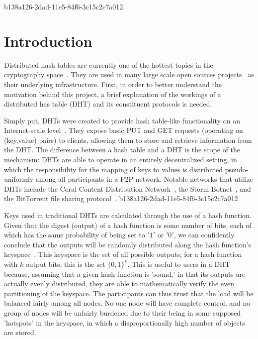 \documentclass[12pt]{article}
\begin{document}
b138a126-2dad-11e5-84f6-3c15c2c7a012\section{Introduction}
\par Distributed hash tables are currently one of the hottest topics in the cryptography space~\cite{Stoica:2001dj,Rowstron:2001ea,Ratnasamy:2001wn}. They are used in many large scale open sources projects~\cite{Freitas:2013tb,Xu:2010vs,Perfitt:2010fh} as their underlying infrastructure. First, in order to better understand the motivation behind this project, a brief explanation of the workings of a distributed has table (DHT) and its constituent protocols is needed.

\par Simply put, DHTs were created to provide hash table-like functionality on an Internet-scale level~\cite{Ratnasamy:2001wn}. They expose basic PUT and GET requests (operating on (key,value) pairs) to clients, allowing them to store and retrieve information from the DHT. The difference between a hash table and a DHT is the scope of the mechanism: DHTs are able to operate in an entirely decentralized setting, in which the responsibility for the mapping of keys to values is distributed pseudo-uniformly among all participants in a P2P network. Notable networks that utilize DHTs include the Coral Content Distribution Network~\cite{Freedman:2004vb}, the Storm Botnet~\cite{Holz:2008uk}, and the BitTorrent file sharing protocol~\cite{Cohen:y1_8mBnw}.
b138a126-2dad-11e5-84f6-3c15c2c7a012
\par Keys used in traditional DHTs are calculated through the use of a hash function. Given that the digest (output) of a hash function is some number of bits, each of which has the same probability of being set to $'1'$ or $'0'$, we can confidently conclude that the outputs will be randomly distributed along the hash function's keyspace~. This keyspace is the set of all possible outputs; for a hash function with $k$ output bits, this is the set $\{0,1\}^k$. This is useful to users in a DHT because, assuming that a given hash function is 'sound,' in that its outputs are actually evenly distributed, they are able to mathematically verify the even partitioning of the keyspace. The participants can thus trust that the load will be balanced fairly among all nodes. No one node will have complete control, and no group of nodes will be unfairly burdened due to their being in some supposed 'hotspots' in the keyspace, in which a disproportionally high number of objects are stored.~
\end{document}
